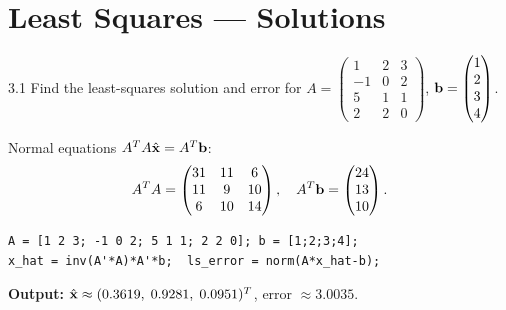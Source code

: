 \chapter{Least Squares --- Solutions}

\begin{exercise}{3.1}
Find the least-squares solution and error for
$A=\begin{pmatrix}1&2&3\\-1&0&2\\5&1&1\\2&2&0\end{pmatrix}$, $\mathbf{b}=\begin{pmatrix}1\\2\\3\\4\end{pmatrix}$.
\end{exercise}
\begin{solution}
Normal equations $A^TA\hat{\mathbf{x}}=A^T\mathbf{b}$:
\[
A^TA=\begin{pmatrix}31&11&6\\11&9&10\\6&10&14\end{pmatrix}, \quad A^T\mathbf{b}=\begin{pmatrix}24\\13\\10\end{pmatrix}.
\]
\begin{lstlisting}
A = [1 2 3; -1 0 2; 5 1 1; 2 2 0]; b = [1;2;3;4];
x_hat = inv(A'*A)*A'*b;  ls_error = norm(A*x_hat-b);
\end{lstlisting}
\textbf{Output:} $\hat{\mathbf{x}}\approx(0.3619,\;0.9281,\;0.0951)^T$, error $\approx 3.0035$.
\end{solution}


